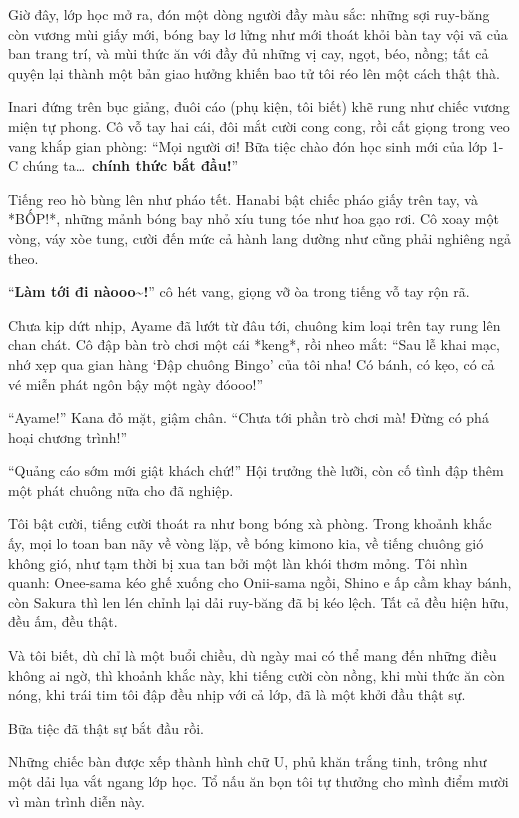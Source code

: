 \documentclass[../main.tex]{subfiles}
\begin{document}
Giờ đây, lớp học mở ra, đón một dòng người đầy màu sắc: những sợi ruy-băng còn vương mùi giấy mới, bóng bay lơ lửng như mới thoát khỏi bàn tay vội vã của ban trang trí, và mùi thức ăn với đầy đủ những vị cay, ngọt, béo, nồng; tất cả quyện lại thành một bản giao hưởng khiến bao tử tôi réo lên một cách thật thà.

Inari đứng trên bục giảng, đuôi cáo (phụ kiện, tôi biết) khẽ rung như chiếc vương miện tự phong. Cô vỗ tay hai cái, đôi mắt cười cong cong, rồi cất giọng trong veo vang khắp gian phòng: ``Mọi người ơi! Bữa tiệc chào đón học sinh mới của lớp 1-C chúng ta\dots\ \textbf{chính thức bắt đầu!}''

Tiếng reo hò bùng lên như pháo tết. Hanabi bật chiếc pháo giấy trên tay, và *BỐP!*, những mảnh bóng bay nhỏ xíu tung tóe như hoa gạo rơi. Cô xoay một vòng, váy xòe tung, cười đến mức cả hành lang dường như cũng phải nghiêng ngả theo.

``\textbf{Làm tới đi nàooo\~{}!}'' cô hét vang, giọng vỡ òa trong tiếng vỗ tay rộn rã.

Chưa kịp dứt nhịp, Ayame đã lướt từ đâu tới, chuông kim loại trên tay rung lên chan chát. Cô đập bàn trò chơi một cái *keng*, rồi nheo mắt: ``Sau lễ khai mạc, nhớ xẹp qua gian hàng `Đập chuông Bingo' của tôi nha! Có bánh, có kẹo, có cả vé miễn phát ngôn bậy một ngày đóooo!''

``Ayame!'' Kana đỏ mặt, giậm chân. ``Chưa tới phần trò chơi mà! Đừng có phá hoại chương trình!''

``Quảng cáo sớm mới giật khách chứ!'' Hội trưởng thè lưỡi, còn cố tình đập thêm một phát chuông nữa cho đã nghiệp.

Tôi bật cười, tiếng cười thoát ra như bong bóng xà phòng. Trong khoảnh khắc ấy, mọi lo toan ban nãy về vòng lặp, về bóng kimono kia, về tiếng chuông gió không gió, như tạm thời bị xua tan bởi một làn khói thơm mỏng. Tôi nhìn quanh: Onee-sama kéo ghế xuống cho Onii-sama ngồi, Shino e ấp cầm khay bánh, còn Sakura thì len lén chỉnh lại dải ruy-băng đã bị kéo lệch. Tất cả đều hiện hữu, đều ấm, đều thật.

Và tôi biết, dù chỉ là một buổi chiều, dù ngày mai có thể mang đến những điều không ai ngờ, thì khoảnh khắc này, khi tiếng cười còn nồng, khi mùi thức ăn còn nóng, khi trái tim tôi đập đều nhịp với cả lớp, đã là một khởi đầu thật sự.

Bữa tiệc đã thật sự bắt đầu rồi.

\ct

Những chiếc bàn được xếp thành hình chữ U, phủ khăn trắng tinh, trông như một dải lụa vắt ngang lớp học.
Tổ nấu ăn bọn tôi tự thưởng cho mình điểm mười vì màn trình diễn này.
\end{document}
